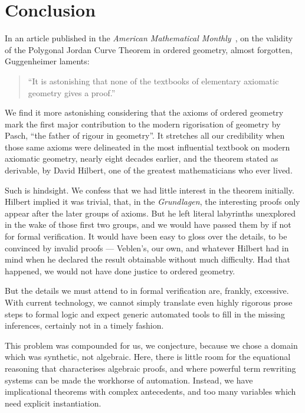 \chapter{Conclusion}\label{chapter:Conclusion}
In an article published in the \emph{American Mathematical Monthly}~\cite{GuggenheimerJordanProof}, on the validity of the Polygonal Jordan Curve Theorem in ordered geometry, almost forgotten, Guggenheimer laments:
\begin{quote}
  ``It is astonishing that none of the textbooks of elementary axiomatic geometry gives a proof.''
\end{quote}

We find it more astonishing considering that the axioms of ordered geometry mark the first major contribution to the modern rigorisation of geometry by Pasch, ``the father of rigour in geometry''. It stretches all our credibility when those same axioms were delineated in the most influential textbook on modern axiomatic geometry, nearly eight decades earlier,  and the theorem stated as derivable, by David Hilbert, one of the greatest mathematicians who ever lived.

Such is hindsight. We confess that we had little interest in the theorem initially. Hilbert implied it was trivial, that, in the \emph{Grundlagen}, the interesting proofs only appear after the later groups of axioms. But he left literal labyrinths unexplored in the wake of those first two groups, and we would have passed them by if not for formal verification. It would have been easy to gloss over the details, to be convinced by invalid proofs --- Veblen's, our own, and whatever Hilbert had in mind when he declared the result obtainable without much difficulty. Had that happened, we would not have done justice to ordered geometry.

But the details we must attend to in formal verification are, frankly, excessive. With current technology, we cannot simply translate even highly rigorous prose steps to formal logic and expect generic automated tools to fill in the missing inferences, certainly not in a timely fashion.

This problem was compounded for us, we conjecture, because we chose a domain which was synthetic, not algebraic. Here, there is little room for the equational reasoning that characterises algebraic proofs, and where powerful term rewriting systems can be made the workhorse of automation. Instead, we have implicational theorems with complex antecedents, and too many variables which need explicit instantiation.

